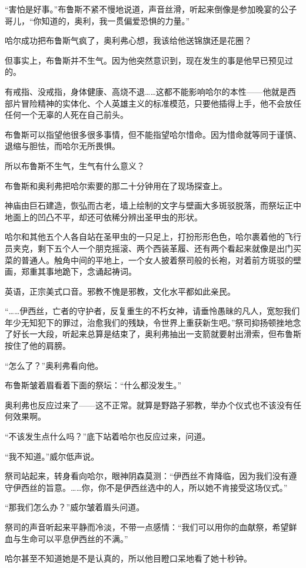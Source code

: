 \documentclass[../main]{subfiles}
\begin{document}
“害怕是好事。”布鲁斯不紧不慢地说道，声音丝滑，听起来倒像是参加晚宴的公子哥儿，“你知道的，奥利，我一贯偏爱恐惧的力量。”

哈尔成功把布鲁斯气疯了，奥利弗心想，我该给他送锦旗还是花圈？

但事实上，布鲁斯并不生气。因为他突然意识到，现在发生的事是他早已预见过的。

有戒指、没戒指，身体健康、高烧不退……这都不能影响哈尔的本性——他就是西部片冒险精神的实体化、个人英雄主义的标准模范，只要他插得上手，他不会放任任何一个无辜的人死在自己前头。

布鲁斯可以指望他很多很多事情，但不能指望哈尔惜命。因为惜命就等同于谨慎、退缩与胆怯，而哈尔无所畏惧。

所以布鲁斯不生气，生气有什么意义？

布鲁斯和奥利弗把哈尔索要的那二十分钟用在了现场探查上。

神庙由巨石建造，恢弘而古老，墙上绘制的文字与壁画大多斑驳脱落，而祭坛正中地面上的凹凸不平，却还可依稀分辨出圣甲虫的形状。

哈尔和其他五个人各自站在圣甲虫的一只足上，打扮形形色色，哈尔裹着他的飞行员夹克，剩下五个人一个朋克摇滚、两个西装革履、还有两个看起来就像是出门买菜的普通人。触角中间的平地上，一个女人披着祭司般的长袍，对着前方斑驳的壁画，郑重其事地跪下，念诵起祷词。

英语，正宗美式口音。邪教不愧是邪教，文化水平都如此亲民。

“……伊西丝，亡者的守护者，反复重生的不朽女神，请垂怜愚昧的凡人，宽恕我们年少无知犯下的罪过，治愈我们的残缺，令世界上重获新生吧。”祭司抑扬顿挫地念了好长一大段，听起来总算是结束了，奥利弗抽出一支箭就要射出滑索，但布鲁斯按住了他的肩膀。

“怎么了？”奥利弗看向他。

布鲁斯皱着眉看着下面的祭坛：“什么都没发生。”

奥利弗也反应过来了——这不正常。就算是野路子邪教，举办个仪式也不该没有任何效果啊。

“不该发生点什么吗？”底下站着哈尔也反应过来，问道。

“我不知道。”威尔低声说。

祭司站起来，转身看向哈尔，眼神阴森莫测：“伊西丝不肯降临，因为我们没有遵守伊西丝的旨意。……你，你不是伊西丝选中的人，所以她不肯接受这场仪式。”

“那我们怎么办？”威尔皱着眉头问道。

祭司的声音听起来平静而冷淡，不带一点感情：“我们可以用你的血献祭，希望鲜血与生命可以平息伊西丝的不满。”

哈尔甚至不知道她是不是认真的，所以他目瞪口呆地看了她十秒钟。
\end{document}
